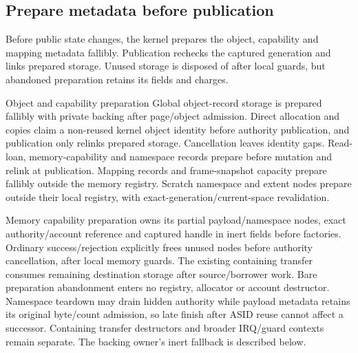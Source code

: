 \subsection{Prepare metadata before publication}

Before public state changes, the kernel prepares the object, capability and
mapping metadata fallibly. Publication rechecks the captured generation and
links prepared storage. Unused storage is disposed of after local guards, but
abandoned preparation retains its fields and charges.

\begin{implementationdetail}{Object and capability preparation}
Global object-record storage is prepared fallibly with private backing after
page/object admission. Direct allocation and copies claim a non-reused kernel
object identity before authority publication, and publication only relinks prepared
storage. Cancellation leaves identity gaps. Read-loan, memory-capability and
namespace records prepare before mutation and relink at publication.
Mapping records and frame-snapshot capacity prepare fallibly outside
the memory registry. Scratch namespace and extent nodes prepare outside
their local registry, with exact-generation/current-space revalidation.

Memory capability preparation owns its partial payload/namespace nodes, exact
authority/account reference and captured handle in inert fields before factories.
Ordinary success/rejection explicitly frees unused nodes before authority
cancellation, after local memory guards. The existing containing transfer consumes
remaining destination storage after source/borrower work. Bare preparation
abandonment enters no registry, allocator or account destructor. Namespace teardown
may drain hidden authority while payload metadata retains its original byte/count
admission, so late finish after ASID reuse cannot affect a successor. Containing
transfer destructors and broader IRQ/guard contexts remain separate. The backing
owner's inert fallback is described below.
\end{implementationdetail}

